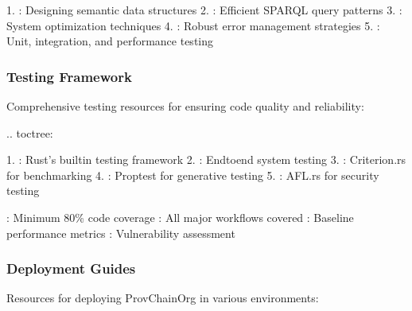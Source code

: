 \documentclass[letterpaper,10pt,english]{sphinxmanual}
\begin{document}
\sphinxAtStartPar
{}
1. : Designing semantic data structures
2. : Efficient SPARQL query patterns
3. : System optimization techniques
4. : Robust error management strategies
5. : Unit, integration, and performance testing


\subsubsection{Testing Framework}
\label{\detokenize{developer/index:testing-framework}}
\sphinxAtStartPar
Comprehensive testing resources for ensuring code quality and reliability:

\sphinxAtStartPar
{}
.. toctree:

\begin{sphinxVerbatim}[commandchars=\\\{\}]
 
  

\end{sphinxVerbatim}

\sphinxAtStartPar
{}
1. : Rust’s built\sphinxhyphen{}in testing framework
2. : End\sphinxhyphen{}to\sphinxhyphen{}end system testing
3. : Criterion.rs for benchmarking
4. : Proptest for generative testing
5. : AFL.rs for security testing

\sphinxAtStartPar
{}
\sphinxhyphen{} : Minimum 80\% code coverage
\sphinxhyphen{} : All major workflows covered
\sphinxhyphen{} : Baseline performance metrics
\sphinxhyphen{} : Vulnerability assessment


\subsubsection{Deployment Guides}
\label{\detokenize{developer/index:deployment-guides}}
\sphinxAtStartPar
Resources for deploying ProvChainOrg in various environments:
\end{document}
